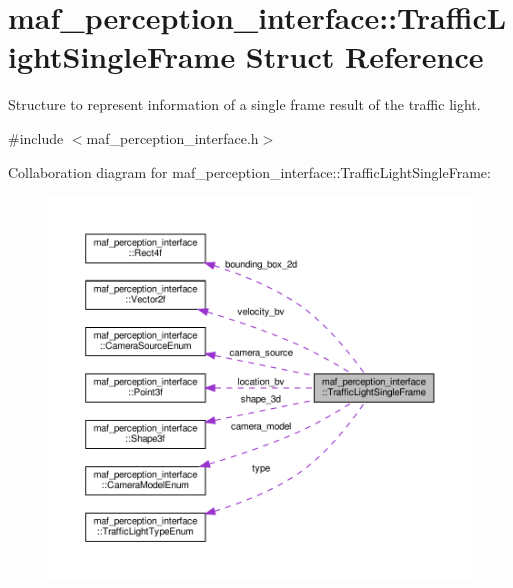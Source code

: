 \hypertarget{structmaf__perception__interface_1_1TrafficLightSingleFrame}{}\section{maf\+\_\+perception\+\_\+interface\+:\+:Traffic\+Light\+Single\+Frame Struct Reference}
\label{structmaf__perception__interface_1_1TrafficLightSingleFrame}


Structure to represent information of a single frame result of the traffic light.  




{\ttfamily \#include $<$maf\+\_\+perception\+\_\+interface.\+h$>$}



Collaboration diagram for maf\+\_\+perception\+\_\+interface\+:\+:Traffic\+Light\+Single\+Frame\+:\nopagebreak
\begin{figure}[H]
\begin{center}
\leavevmode
\includegraphics[width=350pt]{structmaf__perception__interface_1_1TrafficLightSingleFrame__coll__graph}
\end{center}
\end{figure}
